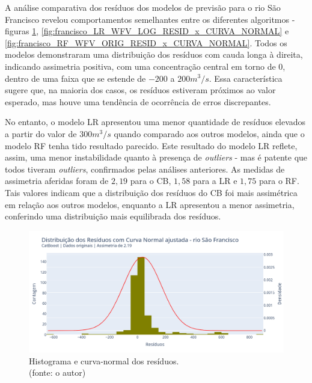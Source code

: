 A análise comparativa dos resíduos dos modelos de previsão para o rio São Francisco revelou comportamentos semelhantes entre os diferentes algoritmos - figuras \ref{fig:francisco_CB_WFV_ORIG_RESID_x_CURVA_NORMAL}, \ref{fig:francisco_LR_WFV_LOG_RESID_x_CURVA_NORMAL} e \ref{fig:francisco_RF_WFV_ORIG_RESID_x_CURVA_NORMAL}. Todos os modelos demonstraram uma distribuição dos resíduos com cauda longa à direita, indicando assimetria positiva, com uma concentração central em torno de $0$, dentro de uma faixa que se estende de $-200$ a $200 m^3/s$. Essa característica sugere que, na maioria dos casos, os resíduos estiveram próximos ao valor esperado, mas houve uma tendência de ocorrência de erros discrepantes.

No entanto, o modelo LR apresentou uma menor quantidade de resíduos elevados a partir do valor de $300 m^3/s$ quando comparado aos outros modelos, ainda que o modelo RF tenha tido resultado parecido. Este resultado do modelo LR reflete, assim, uma menor instabilidade quanto à presença de \textit{outliers} - mas é patente que todos tiveram \textit{outliers}, confirmados pelas análises anteriores. As medidas de assimetria aferidas foram de $2,19$ para o CB, $1,58$ para a LR e $1,75$ para o RF. Tais valores indicam que a distribuição dos resíduos do CB foi mais assimétrica em relação aos outros modelos, enquanto a LR apresentou a menor assimetria, conferindo uma distribuição mais equilibrada dos resíduos.

\begin{figure}[!h]
\centering
\includegraphics[scale=0.33]{Figuras/rio_sao_francisco/wfv/CB/CB_WFV_ORIG_RESID_x_CURVA_NORMAL.png}
\caption{Histograma e curva-normal dos resíduos.\\(fonte: o autor)}
\label{fig:francisco_CB_WFV_ORIG_RESID_x_CURVA_NORMAL}
\end{figure}

